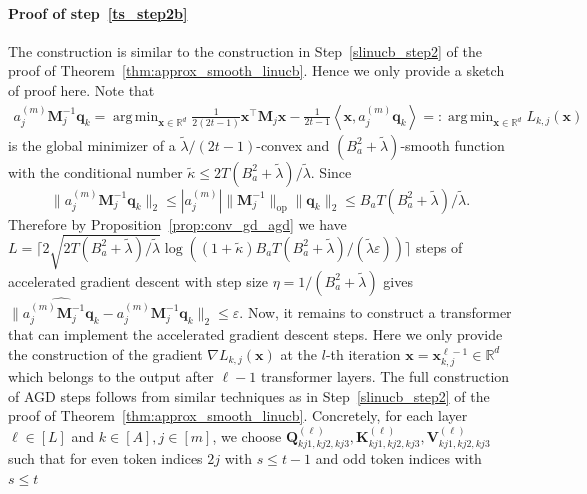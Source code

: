 \documentclass[10pt]{article}
\newcommand{\eps}{\varepsilon}
\DeclareMathOperator*{\argmin}{arg\,min}
\newcommand{\lops}[1]{\|{#1}\|_{\mathrm{op}}}
\newcommand{\<}{\left\langle}
\renewcommand{\>}{\right\rangle}
\renewcommand{\bQ}{\mathbf{Q}}
\newcommand{\R}{\mathbb{R}}
\newcommand{\padecond}{{\tilde \kappa}}
\newcommand{\intvec}{{\mathbf {q}}}
\newcommand{\intmat}{{\mathbf {M}}}
\def\bK{{\mathbf K}}
\def\bQ{{\mathbf Q}}
\def\bV{{\mathbf V}}
\def\bx{{\mathbf x}}
\begin{document}
\paragraph{Proof of step~\ref{ts_step2b}}
The construction is similar to the construction in Step~\ref{slinucb_step2} of the proof of Theorem~\ref{thm:approx_smooth_linucb}. Hence we only provide a sketch of proof here. Note that
\begin{align*}
    a_j^{(m)}\intmat_j^{-1}\intvec_k=\argmin_{\bx\in\R^d}\frac{1}{2(2t-1)}\bx^\top\intmat_j\bx-\frac{1}{2t-1}\<\bx, a_j^{(m)}\intvec_{k}\>=:\argmin_{\bx\in\R^d} L_{k,j}(\bx)
\end{align*}
is the global minimizer of a $\tilde\lambda/(2t-1)$-convex and $(B_a^2+\tilde\lambda)$-smooth function with the conditional number $\padecond\leq 2T(B_a^2+\tilde\lambda)/\tilde\lambda$. Since $$\|a_j^{(m)}\intmat_j^{-1}\intvec_k\|_2\leq|a_j^{(m)}|\lops{\intmat_j^{-1}}\|\intvec_k\|_2\leq B_aT(B_a^2+\tilde\lambda)/\tilde\lambda.$$
Therefore by Proposition~\ref{prop:conv_gd_agd} we have
$L=\lceil2\sqrt{2 T(B_a^2+\tilde\lambda)/\tilde\lambda}\log((1+\padecond)B_aT(B_a^2+\tilde\lambda)/(\tilde\lambda\eps))\rceil$ steps of accelerated gradient descent with step size $\eta=1/(B_a^2+\tilde\lambda)$ gives  $\|\widehat{a_j^{(m)}\intmat_j^{-1}\intvec_k}-a_j^{(m)}\intmat_j^{-1}\intvec_k\|_2\leq\eps$. Now, it remains to construct a transformer that can implement the accelerated gradient descent steps. Here we only provide the construction of the gradient $\nabla L_{k,j}(\bx)$ at the $l$-th iteration $\bx=\bx_{k,j}^{\ell-1}\in\R^d$ which belongs to the output after $\ell-1$ transformer layers.  The full construction of AGD steps follows from similar techniques as in Step~\ref{slinucb_step2} of  the proof of
Theorem~\ref{thm:approx_smooth_linucb}. Concretely, for each layer $\ell\in[L]$ and $k\in[A],j\in[m]$, we choose
$\bQ_{kj1,kj2,kj3}^{(\ell)},\bK_{kj1,kj2,kj3}^{(\ell)},\bV_{kj1,kj2,kj3}^{(\ell)}$ such that for even token indices $2j$ with $s\leq t-1$ and odd token indices with $s\leq t$
\end{document}
